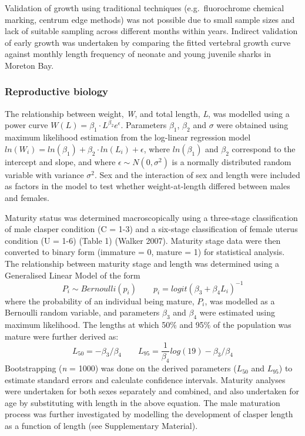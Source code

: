 \documentclass[]{article}
\begin{document}
Validation of growth using traditional techniques (e.g.~fluorochrome
chemical marking, centrum edge methods) was not possible due to small
sample sizes and lack of suitable sampling across different months
within years. Indirect validation of early growth was undertaken by
comparing the fitted vertebral growth curve against monthly length
frequency of neonate and young juvenile sharks in Moreton Bay.

\hypertarget{reproductive-biology}{%
\subsubsection{Reproductive biology}\label{reproductive-biology}}

The relationship between weight, \emph{W}, and total length, \emph{L},
was modelled using a power curve
\(W(L) = \beta_1\cdot L^{\beta_2}e^{\epsilon}\). Parameters \(\beta_1\),
\(\beta_2\) and \(\sigma\) were obtained using maximum likelihood
estimation from the log-linear regression model
\(ln(W_i) = ln(\beta_1) + \beta_2\cdot ln(L_i) + \epsilon\), where
\(ln(\beta_1)\) and \(\beta_2\) correspond to the intercept and slope,
and where \(\epsilon \sim N(0, \sigma^2)\) is a normally distributed
random variable with variance \(\sigma^2\). Sex and the interaction of
sex and length were included as factors in the model to test whether
weight-at-length differed between males and females.

Maturity status was determined macroscopically using a three-stage
classification of male clasper condition (C = 1-3) and a six-stage
classification of female uterus condition (U = 1-6) (Table 1) (Walker
2007). Maturity stage data were then converted to binary form (immature
= 0, mature = 1) for statistical analysis. The relationship between
maturity stage and length was determined using a Generalised Linear
Model of the form
\[ P_i \sim Bernoulli(p_i) \quad\quad p_i = logit(\beta_3 + \beta_4 L_i)^{-1}\]
where the probability of an individual being mature, \(P_i\), was
modelled as a Bernoulli random variable, and parameters \(\beta_3\) and
\(\beta_4\) were estimated using maximum likelihood. The lengths at
which 50\% and 95\% of the population was mature were further derived
as:
\[L_{50} = -\beta_3/\beta_4 \quad\quad L_{95}=\frac{1}{\beta_4}log(19)-\beta_3/\beta_4\]
Bootstrapping (\emph{n} = 1000) was done on the derived parameters
(\(L_{50}\) and \(L_{95}\)) to estimate standard errors and calculate
confidence intervals. Maturity analyses were undertaken for both sexes
separately and combined, and also undertaken for age by substituting
with length in the above equation. The male maturation process was
further investigated by modelling the development of clasper length as a
function of length (see Supplementary Material).
\end{document}
